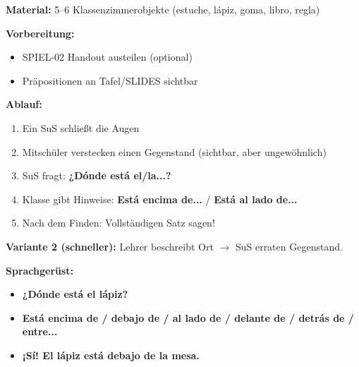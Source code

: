 \documentclass[11pt,a4paper]{article}
\newcommand{\es}[1]{\textbf{#1}}
\begin{document}
\begin{tcolorbox}[colback=white, colframe=spiel, title=\textcolor{white}{\textbf{Spielablauf (15 Min.)}}]

\textbf{Material:} 5--6 Klassenzimmerobjekte (estuche, lápiz, goma, libro, regla)

\vspace{0.3cm}

\textbf{Vorbereitung:}
\begin{itemize}[nosep]
    \item SPIEL-02 Handout austeilen (optional)
    \item Präpositionen an Tafel/SLIDES sichtbar
\end{itemize}

\vspace{0.3cm}

\textbf{Ablauf:}
\begin{enumerate}[nosep]
    \item Ein SuS schließt die Augen
    \item Mitschüler verstecken einen Gegenstand (sichtbar, aber ungewöhnlich)
    \item SuS fragt: \es{¿Dónde está el/la...?}
    \item Klasse gibt Hinweise: \es{Está encima de...} / \es{Está al lado de...}
    \item Nach dem Finden: Vollständigen Satz sagen!
\end{enumerate}

\vspace{0.3cm}

\textbf{Variante 2 (schneller):} Lehrer beschreibt Ort $\rightarrow$ SuS erraten Gegenstand.

\vspace{0.3cm}

\textbf{Sprachgerüst:}
\begin{itemize}[nosep]
    \item \es{¿Dónde está el lápiz?}
    \item \es{Está encima de / debajo de / al lado de / delante de / detrás de / entre...}
    \item \es{¡Sí! El lápiz está debajo de la mesa.}
\end{itemize}

\end{tcolorbox}

\vspace{0.5cm}

\end{document}
